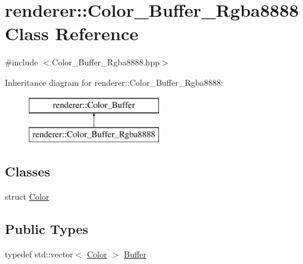 \hypertarget{classrenderer_1_1_color___buffer___rgba8888}{}\section{renderer\+::Color\+\_\+\+Buffer\+\_\+\+Rgba8888 Class Reference}
\label{classrenderer_1_1_color___buffer___rgba8888}


{\ttfamily \#include $<$Color\+\_\+\+Buffer\+\_\+\+Rgba8888.\+hpp$>$}

Inheritance diagram for renderer\+::Color\+\_\+\+Buffer\+\_\+\+Rgba8888\+:\begin{figure}[H]
\begin{center}
\leavevmode
\includegraphics[height=2.000000cm]{classrenderer_1_1_color___buffer___rgba8888}
\end{center}
\end{figure}
\subsection*{Classes}
\begin{DoxyCompactItemize}
\item 
struct \mbox{\hyperlink{structrenderer_1_1_color___buffer___rgba8888_1_1_color}{Color}}
\end{DoxyCompactItemize}
\subsection*{Public Types}
\begin{DoxyCompactItemize}
\item 
typedef std\+::vector$<$ \mbox{\hyperlink{structrenderer_1_1_color___buffer___rgba8888_1_1_color}{Color}} $>$ \mbox{\hyperlink{classrenderer_1_1_color___buffer___rgba8888_a248c7412d48617fba678f54cd0417b8d}{Buffer}}
\end{DoxyCompactItemize}
